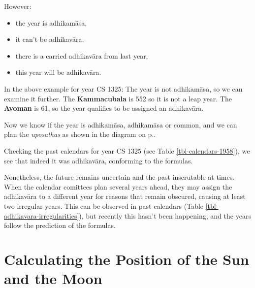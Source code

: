 \documentclass[11pt,oneside]{memoir-article}
\begin{document}

However:

\begin{itemize}
\item {} the year is adhikamāsa,
\item {} it can't be adhikavāra.
\item {} there is a carried adhikavāra from last year,
\item {} this year will be adhikavāra.
\end{itemize}

In the above example for year CS 1325: The year is not adhikamāsa, so we can
examine it further. The \textbf{Kammacubala} is 552 so it is not a leap year. The
\textbf{Avoman} is 61, so the year qualifies to be assigned an adhikavāra.

Now we know if the year is adhikamāsa, adhikamāsa or common, and we can plan the
\emph{uposathas} as shown in the diagram on
p.\pageref{dia-common-adhikamasa-adhikavara}.

Checking the past calendars for year CS 1325 (see Table
\ref{tbl-calendars-1958}), we see that indeed it was adhikavāra, conforming to
the formulas.

Nonetheless, the future remains uncertain and the past inscrutable at times.
When the calendar comittees plan several years ahead, they may assign the
adhikavāra to a different year for reasons that remain obscured, causing at
least two irregular years. This can be observed in past calendars (Table
\ref{tbl-adhikavara-irregularities}), but recently this hasn't been happening,
and the years follow the prediction of the formulas.

\section{Calculating the Position of the Sun and the Moon}
\label{sec-4-5}
\end{document}
